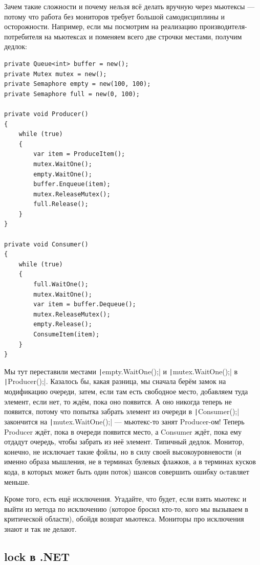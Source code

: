 \documentclass{../../text-style}
\begin{document}
Зачем такие сложности и почему нельзя всё делать вручную через мьютексы --- потому что работа без мониторов требует большой самодисциплины и осторожности. Например, если мы посмотрим на реализацию производителя-потребителя на мьютексах и поменяем всего две строчки местами, получим дедлок:

\begin{verbatim}
private Queue<int> buffer = new();
private Mutex mutex = new();
private Semaphore empty = new(100, 100);
private Semaphore full = new(0, 100);

private void Producer()
{
    while (true)
    {
        var item = ProduceItem();
        mutex.WaitOne();
        empty.WaitOne();
        buffer.Enqueue(item);
        mutex.ReleaseMutex();
        full.Release();
    }
}

private void Consumer()
{
    while (true)
    {
        full.WaitOne();
        mutex.WaitOne();
        var item = buffer.Dequeue();
        mutex.ReleaseMutex();
        empty.Release();
        ConsumeItem(item);
    }
}
\end{verbatim}

Мы тут переставили местами \texttt|empty.WaitOne();| и \texttt|mutex.WaitOne();| в \texttt|Producer();|. Казалось бы, какая разница, мы сначала берём замок на модификацию очереди, затем, если там есть свободное место, добавляем туда элемент, если нет, то ждём, пока оно появится. А оно никогда теперь не появится, потому что попытка забрать элемент из очереди в \texttt|Consumer();| закончится на \texttt|mutex.WaitOne();| --- мьютекс-то занят Producer-ом! Теперь Producer ждёт, пока в очереди появится место, а Consumer ждёт, пока ему отдадут очередь, чтобы забрать из неё элемент. Типичный дедлок. Монитор, конечно, не исключает такие фэйлы, но в силу своей высокоуровневости (и именно образа мышления, не в терминах булевых флажков, а в терминах кусков кода, в которых может быть один поток) шансов совершить ошибку оcтавляет меньше. 

Кроме того, есть ещё исключения. Угадайте, что будет, если взять мьютекс и выйти из метода по исключению (которое бросил кто-то, кого мы вызываем в критической области), обойдя возврат мьютекса. Мониторы про исключения знают и так не делают.

\subsection{lock в .NET}
\end{document}
